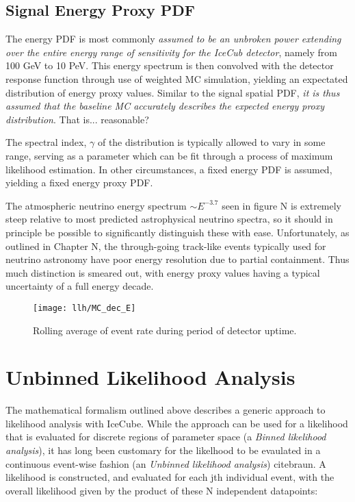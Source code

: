 \subsection{Signal Energy Proxy PDF}

The energy PDF is most commonly \emph{assumed to be an unbroken power extending over the entire energy range of sensitivity for the IceCub detector}, namely from 100 GeV to 10 PeV. This energy spectrum is then convolved with the detector response function through use of weighted MC simulation, yielding an expectated distribution of energy proxy values. Similar to the signal spatial PDF, \emph{it is thus assumed that the baseline MC accurately describes the expected energy proxy distribution}. That is... reasonable?

The spectral index, $\gamma$ of the distribution is typically allowed to vary in some range, serving as a parameter which can be fit through a process of maximum likelihood estimation. In other circumstances, a fixed energy PDF is assumed, yielding a fixed energy proxy PDF.

The atmospheric neutrino energy spectrum $\sim E^{-3.7}$ seen in figure N is extremely steep relative to most predicted astrophysical neutrino spectra, so it should in principle be possible to significantly distinguish these with ease. Unfortunately, as outlined in Chapter N, the through-going track-like events typically used for neutrino astronomy have poor energy resolution due to partial containment. Thus much distinction is smeared out, with energy proxy values having a typical uncertainty of a full energy decade.

\begin{figure}[!ht]
	\centering \texttt{[image: llh/MC\_dec\_E]}
	\caption{Rolling average of event rate during period of detector uptime.}
	\label{fig:mc_dec_e}
\end{figure}

\section{Unbinned Likelihood Analysis}
The mathematical formalism outlined above describes a generic approach to likelihood analysis with IceCube. While the approach can be used for a likelihood that is evaluated for discrete regions of parameter space (a \emph{Binned likelihood analysis}), it has long been customary for the likelhood to be evaulated in a continuous event-wise fashion (an \emph{Unbinned likelihood analysis}) citebraun. A likelihood is constructed, and evaluated for each jth individual event, with the overall likelihood given by the product of these N independent datapoints:

